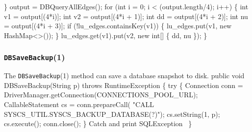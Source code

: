 \documentclass{article}
\def\nwendcode{\endtrivlist \endgroup}      %
\let\nwdocspar=\par
\theoremstyle{definition}                   %
\begin{document}
\}
output = DBQueryAllEdges();
for (int i = 0; i < (output.length/4); i++) \{
  int v1 = output[(4*i)];
  int v2 = output[(4*i + 1)];
  int dd = output[(4*i + 2)];
  int nu = output[(4*i + 3)];
  if (!lu_edges.containsKey(v1)) \{
    lu_edges.put(v1, new HashMap<>());
  \}
  lu_edges.get(v1).put(v2, new int[] \{ dd, nu \});
\}
\nwendcode{}\nwdocspar

\subsubsection{{\tt{}\protect{}DBSaveBackup}(1)}
The {\tt{}\protect{}DBSaveBackup}(1) method can save a database snapshot to disk.
\nwenddocs{}\endmoddef{}
public void DBSaveBackup(String p) throws RuntimeException \{
  try \{
    Connection conn = DriverManager.getConnection(CONNECTIONS_POOL_URL);
    CallableStatement cs = conn.prepareCall(
      "CALL SYSCS_UTIL.SYSCS_BACKUP_DATABASE(?)");
    cs.setString(1, p);
    cs.execute();
    conn.close();
  \}
  \LA{}Catch and print \code{}SQLException\edoc{}~{\nwtagstyle{}}\RA{}
\}
\eatline
{}\nwendcode{}\nwdocspar
\end{document}
